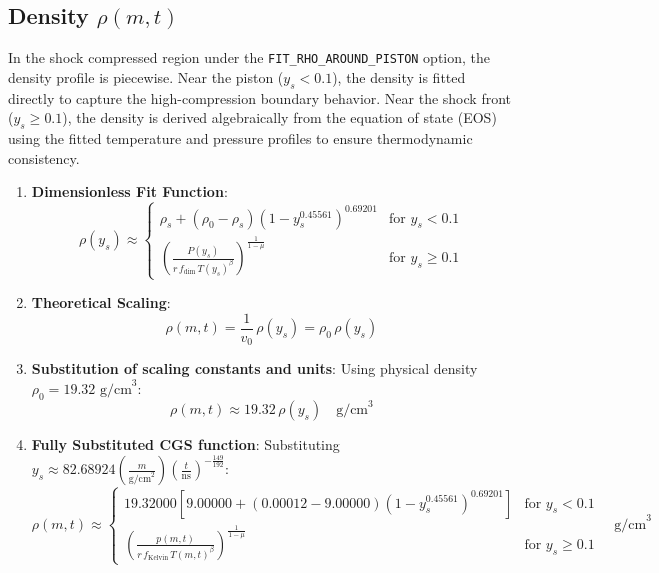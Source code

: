 \documentclass[11pt]{article}
\begin{document}
\subsection{Density $\rho(m,t)$}
In the shock compressed region under the \texttt{FIT\_RHO\_AROUND\_PISTON} option, the density profile is piecewise. Near the piston ($y_s < 0.1$), the density is fitted directly to capture the high-compression boundary behavior. Near the shock front ($y_s \ge 0.1$), the density is derived algebraically from the equation of state (EOS) using the fitted temperature and pressure profiles to ensure thermodynamic consistency.
\begin{enumerate}
    \item \textbf{Dimensionless Fit Function}:
    $$\rho(y_s) \approx \begin{cases} 
        \rho_s + (\rho_0 - \rho_s) (1 - y_s^{0.45561})^{0.69201} & \text{for } y_s < 0.1 \\
        \left( \frac{P(y_s)}{r \, f_{\text{dim}} \, T(y_s)^\beta} \right)^{\frac{1}{1-\mu}} & \text{for } y_s \ge 0.1 
    \end{cases}$$
    
    \item \textbf{Theoretical Scaling}:
    $$\rho(m,t) = \frac{1}{v_0} \, \rho(y_s) = \rho_0 \, \rho(y_s)$$
    
    \item \textbf{Substitution of scaling constants and units}:
    Using physical density $\rho_0 = 19.32 \text{ g/cm}^3$:
    $$\rho(m,t) \approx 19.32 \, \rho(y_s) \quad \text{g/cm}^3$$
    
    \item \textbf{Fully Substituted CGS function}:
    Substituting $y_s \approx 82.68924 \left(\frac{m}{\text{g/cm}^2}\right) \left(\frac{t}{\text{ns}}\right)^{-\frac{149}{192}}$:
    $$\rho(m,t) \approx \begin{cases}
        19.32000 \left[ 9.00000 + (0.00012 - 9.00000) (1 - y_s^{0.45561})^{0.69201} \right] & \text{for } y_s < 0.1 \\
        \left( \frac{p(m,t)}{r \, f_{\text{Kelvin}} \, T(m,t)^\beta} \right)^{\frac{1}{1-\mu}} & \text{for } y_s \ge 0.1 
    \end{cases} \quad \text{g/cm}^3$$
\end{enumerate}
\end{document}
